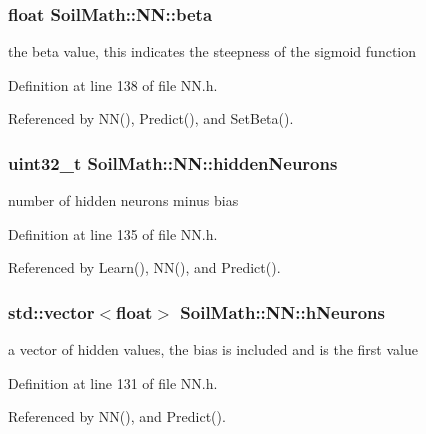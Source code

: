 \subsubsection[{beta}]{\setlength{\rightskip}{0pt plus 5cm}float Soil\+Math\+::\+N\+N\+::beta\hspace{0.3cm}{\ttfamily [private]}}\label{class_soil_math_1_1_n_n_a4bb773955d78fa6f064b39a9149b78c8}
the beta value, this indicates the steepness of the sigmoid function 

Definition at line 138 of file N\+N.\+h.



Referenced by N\+N(), Predict(), and Set\+Beta().

\hypertarget{class_soil_math_1_1_n_n_aedf4b2ddaae281d83e666c308e5d67c4}{}
\subsubsection[{hidden\+Neurons}]{\setlength{\rightskip}{0pt plus 5cm}uint32\+\_\+t Soil\+Math\+::\+N\+N\+::hidden\+Neurons\hspace{0.3cm}{\ttfamily [private]}}\label{class_soil_math_1_1_n_n_aedf4b2ddaae281d83e666c308e5d67c4}
number of hidden neurons minus bias 

Definition at line 135 of file N\+N.\+h.



Referenced by Learn(), N\+N(), and Predict().

\hypertarget{class_soil_math_1_1_n_n_a459bde01ce33e0b27803cbe4a3b114b4}{}
\subsubsection[{h\+Neurons}]{\setlength{\rightskip}{0pt plus 5cm}std\+::vector$<$float$>$ Soil\+Math\+::\+N\+N\+::h\+Neurons\hspace{0.3cm}{\ttfamily [private]}}\label{class_soil_math_1_1_n_n_a459bde01ce33e0b27803cbe4a3b114b4}
a vector of hidden values, the bias is included and is the first value 

Definition at line 131 of file N\+N.\+h.



Referenced by N\+N(), and Predict().

